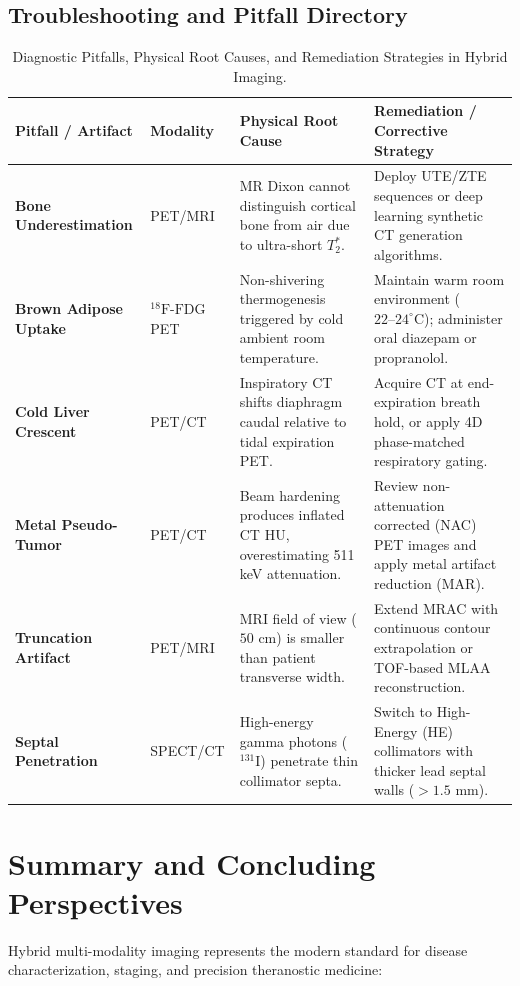 \documentclass[11pt,a4paper]{article}
\begin{document}
\subsection{Troubleshooting and Pitfall Directory}

\begin{table}[htbp]
\centering
\small
\setlength{\tabcolsep}{2.5pt}
\caption{Diagnostic Pitfalls, Physical Root Causes, and Remediation Strategies in Hybrid Imaging.}
\label{tab:pitfalls}
\begin{tabular}{p{3.2cm} p{2.4cm} p{4.2cm} p{4.6cm}}
\toprule
\textbf{Pitfall / Artifact} & \textbf{Modality} & \textbf{Physical Root Cause} & \textbf{Remediation / Corrective Strategy} \\
\midrule
\textbf{Bone Underestimation} & PET/MRI & MR Dixon cannot distinguish cortical bone from air due to ultra-short $T_2^*$. & Deploy UTE/ZTE sequences or deep learning synthetic CT generation algorithms. \\
\addlinespace
\textbf{Brown Adipose Uptake} & $^{18}\text{F}\text{-FDG}$ PET & Non-shivering thermogenesis triggered by cold ambient room temperature. & Maintain warm room environment ($22\text{--}24^\circ\text{C}$); administer oral diazepam or propranolol. \\
\addlinespace
\textbf{Cold Liver Crescent} & PET/CT & Inspiratory CT shifts diaphragm caudal relative to tidal expiration PET. & Acquire CT at end-expiration breath hold, or apply 4D phase-matched respiratory gating. \\
\addlinespace
\textbf{Metal Pseudo-Tumor} & PET/CT & Beam hardening produces inflated CT HU, overestimating 511 keV attenuation. & Review non-attenuation corrected (NAC) PET images and apply metal artifact reduction (MAR). \\
\addlinespace
\textbf{Truncation Artifact} & PET/MRI & MRI field of view ($50\text{ cm}$) is smaller than patient transverse width. & Extend MRAC with continuous contour extrapolation or TOF-based MLAA reconstruction. \\
\addlinespace
\textbf{Septal Penetration} & SPECT/CT & High-energy gamma photons ($^{131}\text{I}$) penetrate thin collimator septa. & Switch to High-Energy (HE) collimators with thicker lead septal walls ($> 1.5\text{ mm}$). \\
\bottomrule
\end{tabular}
\end{table}

\section{Summary and Concluding Perspectives}
Hybrid multi-modality imaging represents the modern standard for disease characterization, staging, and precision theranostic medicine:
\end{document}
